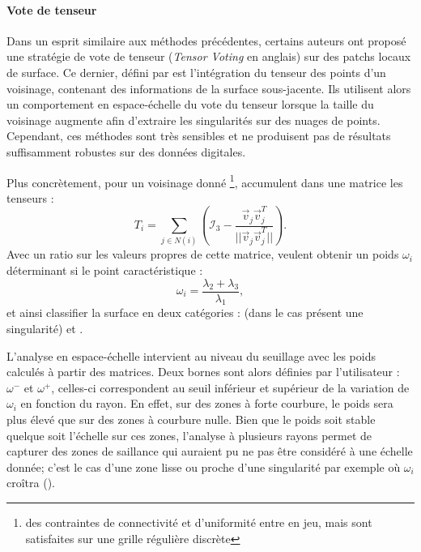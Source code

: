 \paragraph{Vote de tenseur}

Dans un esprit similaire aux méthodes précédentes, certains auteurs \cite{Park2012} ont proposé une stratégie de
vote de tenseur (\emph{Tensor Voting} en anglais) sur des patchs locaux de
surface. Ce dernier, défini par  est l'intégration du tenseur des points d'un voisinage,
contenant des informations de la surface sous-jacente. Ils utilisent alors un comportement en espace-échelle du vote du
tenseur lorsque la taille du voisinage augmente afin d'extraire les singularités sur
des nuages de points. Cependant, ces méthodes sont très sensibles et ne
produisent pas de résultats suffisamment robustes sur des données digitales.

Plus concrètement, pour un
voisinage donné \footnote{des contraintes de connectivité et d'uniformité entre
en jeu, mais sont satisfaites sur une grille régulière discrète},  accumulent dans une matrice les tenseurs :
\begin{equation}
  T_i = \sum\limits_{j \in N(i)} \left(\mathcal{I}_3 - \frac{\overrightarrow{v}_j\overrightarrow{v}_j^T}{||\overrightarrow{v}_j\overrightarrow{v}_j^T||} \right) .
\end{equation}
Avec un ratio sur les valeurs propres de cette matrice,  veulent
obtenir un poids $\omega_i$ déterminant si le point caractéristique :
\begin{equation}
  \omega_i = \frac{\lambda_2 + \lambda_3}{\lambda_1},
\end{equation}
et ainsi classifier la surface en deux catégories : \Feature (\cad dans le cas
présent une singularité) et \NonFeature.

L'analyse en espace-échelle intervient au niveau du seuillage avec les poids
calculés à partir des matrices. Deux bornes sont alors définies par
l'utilisateur : $\omega^-$ et $\omega^+$, celles-ci correspondent au seuil
inférieur et supérieur de la variation de $\omega_i$ en fonction du rayon. En
effet, sur des zones à forte courbure, le poids sera plus élevé que sur des
zones à courbure nulle. Bien que le poids soit stable quelque soit l'échelle sur
ces zones, l'analyse à plusieurs rayons permet de capturer des zones de
saillance qui auraient pu ne pas être considéré à une échelle donnée; c'est le
cas d'une zone lisse ou proche d'une singularité par exemple où $\omega_i$ croîtra
().

